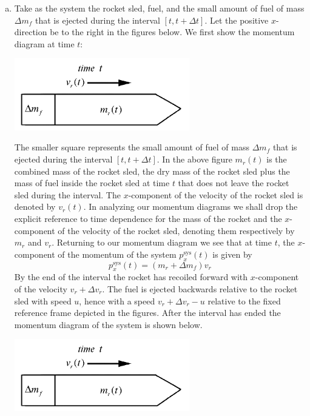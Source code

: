 \documentclass{esg8012exam}
\begin{document}
\begin{solution}
  \begin{enumerate}[(a)]
    \item 
      Take as the system the rocket sled, fuel, and the small amount of fuel of mass $\Delta m_f$ that is ejected during the interval $[t, t + \Delta t]$. Let the positive $x$-direction be to the right in the figures below. We first show the momentum diagram at time $t$:
      \begin{center}\includegraphics[width=0.6\textwidth]{exam2_s3_1}\end{center}
      The smaller square represents the small amount of fuel of mass $\Delta m_f$ that is ejected during the interval $[t,t+\Delta t]$. In the above figure $m_r (t)$ is the combined mass of the rocket sled, the dry mass of the rocket sled plus the mass of fuel inside the rocket sled at time $t$ that does not leave the rocket sled during the interval. The $x$-component of the velocity of the rocket sled is denoted by $v_r(t)$.  In analyzing our momentum diagrams we shall drop the explicit reference to time dependence for the mass of the rocket and the $x$-component of the velocity of the rocket sled, denoting them respectively by $m_r$ and $v_r $. Returning to our momentum diagram we see that at time $t$, the $x$-component of the momentum of the system $p_x^\text{sys}(t)$ is given by
      \begin{equation} p_x^\text{sys}(t)=(m_r +\Delta m_f) v_r  \label{eq:3:p_x^sys(t)} \end{equation}
      By the end of the interval the rocket has recoiled forward with $x$-component of the velocity $v_r +\Delta v_r $. The fuel is ejected backwards relative to the rocket sled with speed $u$, hence with a speed $v_r +\Delta v_r -u$ relative to the fixed reference frame depicted in the figures. After the interval has ended the momentum diagram of the system is shown below.
      \begin{center}\includegraphics[width=0.6\textwidth]{exam2_s3_1}\end{center}

\end{enumerate}
\end{solution}
\end{document}

